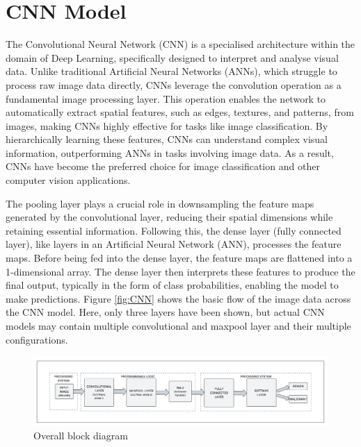     \section{CNN Model}
    \noindent
    The Convolutional Neural Network (CNN) is a specialised architecture within the domain of Deep Learning, specifically designed to interpret and analyse visual data. Unlike traditional Artificial Neural Networks (ANNs), which struggle to process raw image data directly, CNNs leverage the convolution operation as a fundamental image processing layer. This operation enables the network to automatically extract spatial features, such as edges, textures, and patterns, from images, making CNNs highly effective for tasks like image classification. By hierarchically learning these features, CNNs can understand complex visual information, outperforming ANNs in tasks involving image data. As a result, CNNs have become the preferred choice for image classification and other computer vision applications. \par \noindent
    The pooling layer plays a crucial role in downsampling the feature maps generated by the convolutional layer, reducing their spatial dimensions while retaining essential information. Following this, the dense layer (fully connected layer), like layers in an Artificial Neural Network (ANN), processes the feature maps. Before being fed into the dense layer, the feature maps are flattened into a 1-dimensional array. The dense layer then interprets these features to produce the final output, typically in the form of class probabilities, enabling the model to make predictions. Figure \ref{fig:CNN} shows the basic flow of the image data across the CNN model. Here, only three layers have been shown, but actual CNN models may contain multiple convolutional and maxpool layer and their multiple configurations. 

    \begin{figure}
        \centering
        \includegraphics[width=1\linewidth]{images/block diagram overall.png}
        \caption{Overall block diagram}
        \label{fig:overall block diagram}
    \end{figure}

